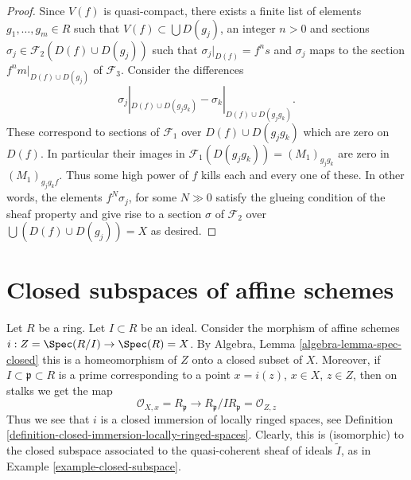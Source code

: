 \begin{proof}
\medskip\noindent
Since $V(f)$ is quasi-compact, there exists a finite list
of elements $g_1, \ldots, g_m \in R$ such that
$V(f) \subset \bigcup D(g_j)$, an integer $n > 0$ and sections
$\sigma_j \in \mathcal{F}_2(D(f) \cup D(g_j))$ such that
$\sigma_j|_{D(f)} = f^n s$ and $\sigma_j$ maps to the section
$f^nm|_{D(f) \cup D(g_j)}$ of $\mathcal{F}_3$.
Consider the differences
$$
\sigma_j|_{D(f) \cup D(g_jg_k)}
-
\sigma_k|_{D(f) \cup D(g_jg_k)}.
$$
These correspond to sections of $\mathcal{F}_1$
over $D(f) \cup D(g_jg_k)$ which are zero
on $D(f)$. In particular their images in
$\mathcal{F}_1(D(g_jg_k)) = (M_1)_{g_jg_k}$
are zero in $(M_1)_{g_jg_kf}$.
Thus some high power of $f$ kills each and every one of these.
In other words, the elements $f^N \sigma_j$, for some $N \gg 0$
satisfy the glueing condition of the sheaf property and
give rise to a section $\sigma $ of $\mathcal{F}_2$
over $\bigcup (D(f) \cup D(g_j)) = X$ as desired.
\end{proof}







\section{Closed subspaces of affine schemes}
\label{section-closed-in-affine}

\begin{example}
\label{example-closed-immersion-affines}
\begin{reference}
\cite[Chapter II, \S 1, no. 31, Proposition 4 and Corollary,
p. 225]{FAC}
\end{reference}
Let $R$ be a ring.
Let $I \subset R$ be an ideal.
Consider the morphism of affine schemes
$i : Z = \Spec(R/I) \to \Spec(R) = X$.
By Algebra, Lemma \ref{algebra-lemma-spec-closed}
this is a homeomorphism of $Z$ onto a closed
subset of $X$. Moreover, if $I \subset \mathfrak p \subset R$
is a prime corresponding to a point $x = i(z)$, $x \in X$,
$z \in Z$, then on stalks we get the map
$$
\mathcal{O}_{X, x} = R_{\mathfrak p}
\longrightarrow
R_{\mathfrak p}/IR_{\mathfrak p} = \mathcal{O}_{Z, z}
$$
Thus we see that $i$ is a closed immersion of locally ringed spaces,
see Definition \ref{definition-closed-immersion-locally-ringed-spaces}.
Clearly, this is (isomorphic) to the closed subspace associated
to the quasi-coherent sheaf of ideals $\widetilde I$, as in
Example \ref{example-closed-subspace}.
\end{example}

